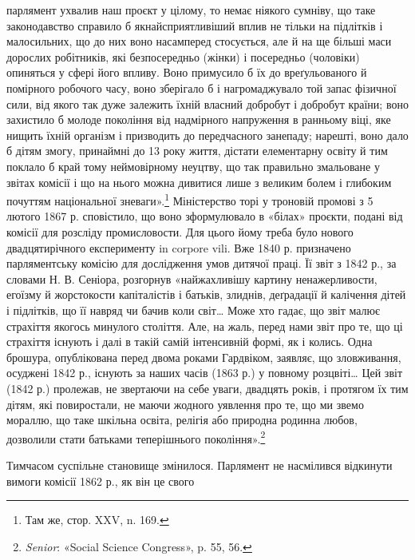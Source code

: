 \parcont{}  %
парлямент ухвалив наш проєкт у цілому, то немає ніякого сумніву,
що таке законодавство справило б якнайсприятливіший
вплив не тільки на підлітків і малосильних, що до них воно
насамперед стосується, але й на ще більші маси дорослих робітників,
які безпосередньо (жінки) і посередньо (чоловіки) опиняться
у сфері його впливу. Воно примусило б їх до вреґульованого
й помірного робочого часу, воно зберігало б і нагромаджувало
той запас фізичної сили, від якого так дуже залежить їхній
власний добробут і добробут країни; воно захистило б молоде
покоління від надмірного напруження в ранньому віці, яке
нищить їхній організм і призводить до передчасного занепаду;
нарешті, воно дало б дітям змогу, принаймні до 13 року життя,
дістати елементарну освіту й тим поклало б край тому неймовірному
неуцтву, що так правильно змальоване у звітах комісії
і що на нього можна дивитися лише з великим болем і глибоким
почуттям національної зневаги».\footnote{
Там же, стор. XXV, n. 169.
} Міністерство торі у троновій
промові з 5 лютого 1867 р. сповістило, що воно зформулювало в
«білах» проєкти, подані від комісії для розсліду промисловости.
Для цього йому треба було нового двадцятирічного
експерименту in corpore vili. Вже 1840 р. призначено парляментську
комісію для дослідження умов дитячої праці. Її звіт з 1842 р.,
за словами Н. В. Сеніора, розгорнув «найжахливішу картину
ненажерливости, егоїзму й жорстокости капіталістів і батьків,
злиднів, деґрадації й калічення дітей і підлітків, що її навряд
чи бачив коли світ\dots{} Може хто гадає, що звіт малює страхіття
якогось минулого століття. Але, на жаль, перед нами звіт про
те, що ці страхіття існують і далі в такій самій інтенсивній формі,
як і колись. Одна брошура, опублікована перед двома роками
Гардвіком, заявляє, що зловживання, осуджені 1842 р.,
існують за наших часів (1863 р.) у повному розцвіті\dots{} Цей звіт
(1842 р.) пролежав, не звертаючи на себе уваги, двадцять років,
і протягом їх тим дітям, які повиростали, не маючи жодного
уявлення про те, що ми звемо мораллю, що таке шкільна освіта,
релігія або природна родинна любов, дозволили стати батьками
теперішнього покоління».\footnote{
\emph{Senior}: «Social Science Congress», p. 55, 56.
}

Тимчасом суспільне становище змінилося. Парлямент не
насмілився відкинути вимоги комісії 1862 р., як він це свого
\parbreak{}  %
